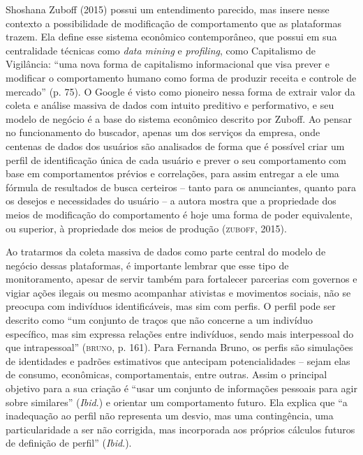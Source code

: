 Shoshana Zuboff (2015) possui um entendimento parecido, mas insere nesse
contexto a possibilidade de modificação de comportamento que as
plataformas trazem. Ela define esse sistema econômico contemporâneo, que
possui em sua centralidade técnicas como \emph{data mining} e
\emph{profiling}, como Capitalismo de Vigilância: ``uma nova forma de
capitalismo informacional que visa prever e modificar o comportamento
humano como forma de produzir receita e controle de mercado'' (p. 75). O
Google é visto como pioneiro nessa forma de extrair valor da coleta e
análise massiva de dados com intuito preditivo e performativo, e seu
modelo de negócio é a base do sistema econômico descrito por Zuboff. Ao
pensar no funcionamento do buscador, apenas um dos serviços da empresa,
onde centenas de dados dos usuários são analisados de forma que é
possível criar um perfil de identificação única de cada usuário e prever
o seu comportamento com base em comportamentos prévios e correlações,
para assim entregar a ele uma fórmula de resultados de busca certeiros
-- tanto para os anunciantes, quanto para os desejos e necessidades do
usuário -- a autora mostra que a propriedade dos meios de modificação do
comportamento é hoje uma forma de poder equivalente, ou superior, à
propriedade dos meios de produção (\textsc{zuboff}, 2015).

Ao tratarmos da coleta massiva de dados como parte central do modelo de
negócio dessas plataformas, é importante lembrar que esse tipo de
monitoramento, apesar de servir também para fortalecer parcerias com
governos e vigiar ações ilegais ou mesmo acompanhar ativistas e
movimentos sociais, não se preocupa com indivíduos identificáveis, mas
sim com perfis. O perfil pode ser descrito como ``um conjunto de traços
que não concerne a um indivíduo específico, mas sim expressa relações
entre indivíduos, sendo mais interpessoal do que intrapessoal'' (\textsc{bruno}, p.
161). Para Fernanda Bruno, os perfis são simulações de identidades e
padrões estimativos que antecipam potencialidades ­-- sejam elas de
consumo, econômicas, comportamentais, entre outras. Assim o principal
objetivo para a sua criação é ``usar um conjunto de informações pessoais
para agir sobre similares'' (\emph{Ibid}.) e orientar um comportamento futuro.
Ela explica que ``a inadequação ao perfil não representa um desvio, mas
uma contingência, uma particularidade a ser não corrigida, mas
incorporada aos próprios cálculos futuros de definição de
perfil'' (\emph{Ibid}.).

